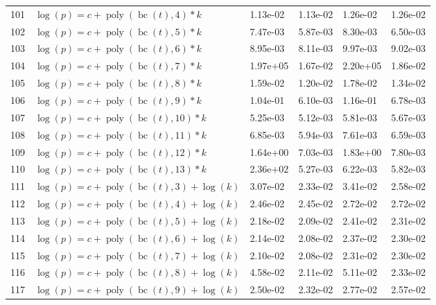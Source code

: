 \documentclass[12pt,a4paper]{article}
\DeclareMathOperator{\bc}{bc}
\DeclareMathOperator{\poly}{poly}
\begin{document}
\begin{longtable}[t]{ll>{\raggedleft\arraybackslash}p{2cm}>{\raggedleft\arraybackslash}p{2cm}>{\raggedleft\arraybackslash}p{2cm}>{\raggedleft\arraybackslash}p{2cm}}
\rowcolor{gray!6}  101 & $\log(p) = c + \poly\left( \bc(t), 4 \right) * k$ & 1.13e-02 & 1.13e-02 & 1.26e-02 & 1.26e-02\\
102 & $\log(p) = c + \poly\left( \bc(t), 5 \right) * k$ & 7.47e-03 & 5.87e-03 & 8.30e-03 & 6.50e-03\\
\rowcolor{gray!6}  103 & $\log(p) = c + \poly\left( \bc(t), 6 \right) * k$ & 8.95e-03 & 8.11e-03 & 9.97e-03 & 9.02e-03\\
104 & $\log(p) = c + \poly\left( \bc(t), 7 \right) * k$ & 1.97e+05 & 1.67e-02 & 2.20e+05 & 1.86e-02\\
\rowcolor{gray!6}  105 & $\log(p) = c + \poly\left( \bc(t), 8 \right) * k$ & 1.59e-02 & 1.20e-02 & 1.78e-02 & 1.34e-02\\
106 & $\log(p) = c + \poly\left( \bc(t), 9 \right) * k$ & 1.04e-01 & 6.10e-03 & 1.16e-01 & 6.78e-03\\
\rowcolor{gray!6}  107 & $\log(p) = c + \poly\left( \bc(t), 10 \right) * k$ & 5.25e-03 & 5.12e-03 & 5.81e-03 & 5.67e-03\\
108 & $\log(p) = c + \poly\left( \bc(t), 11 \right) * k$ & 6.85e-03 & 5.94e-03 & 7.61e-03 & 6.59e-03\\
\rowcolor{gray!6}  109 & $\log(p) = c + \poly\left( \bc(t), 12 \right) * k$ & 1.64e+00 & 7.03e-03 & 1.83e+00 & 7.80e-03\\
110 & $\log(p) = c + \poly\left( \bc(t), 13 \right) * k$ & 2.36e+02 & 5.27e-03 & 6.22e-03 & 5.82e-03\\
\rowcolor{gray!6}  111 & $\log(p) = c + \poly\left( \bc(t), 3 \right) + \log(k)$ & 3.07e-02 & 2.33e-02 & 3.41e-02 & 2.58e-02\\
112 & $\log(p) = c + \poly\left( \bc(t), 4 \right) + \log(k)$ & 2.46e-02 & 2.45e-02 & 2.72e-02 & 2.72e-02\\
\rowcolor{gray!6}  113 & $\log(p) = c + \poly\left( \bc(t), 5 \right) + \log(k)$ & 2.18e-02 & 2.09e-02 & 2.41e-02 & 2.31e-02\\
114 & $\log(p) = c + \poly\left( \bc(t), 6 \right) + \log(k)$ & 2.14e-02 & 2.08e-02 & 2.37e-02 & 2.30e-02\\
\rowcolor{gray!6}  115 & $\log(p) = c + \poly\left( \bc(t), 7 \right) + \log(k)$ & 2.10e-02 & 2.08e-02 & 2.31e-02 & 2.30e-02\\
116 & $\log(p) = c + \poly\left( \bc(t), 8 \right) + \log(k)$ & 4.58e-02 & 2.11e-02 & 5.11e-02 & 2.33e-02\\
\rowcolor{gray!6}  117 & $\log(p) = c + \poly\left( \bc(t), 9 \right) + \log(k)$ & 2.50e-02 & 2.32e-02 & 2.77e-02 & 2.57e-02\\

\end{longtable}
\end{document}
